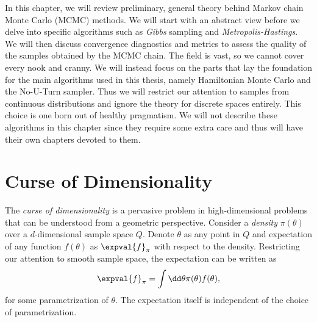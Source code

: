 In this chapter, we will review preliminary, general theory behind Markov chain Monte Carlo (MCMC) methods. We will start with an abstract view before we delve into
specific algorithms such as \textit{Gibbs} sampling and \textit{Metropolis-Hastings}. We will then discuss convergence diagnostics and metrics to assess the
quality of the samples obtained by the MCMC chain. The field is vast, so we cannot cover every nook and cranny. We will instead
focus on the parts that lay the foundation for the main algorithms used in this thesis, namely Hamiltonian Monte Carlo and the No-U-Turn sampler. 
Thus we will restrict our attention to samples from continuous distributions and ignore the theory for discrete spaces entirely.
This choice is one born out of healthy pragmatism.
We will not describe these algorithms in this chapter since they require some extra care and thus will have their own chapters devoted to them.

\begin{comment}
  \section{Curse of Dimensionality}
The \textit{curse of dimensionality} can be understood from a geometric perspective. 
Consider a \textit{density} $\pi(\theta)$ over a space $d$-dimensional space $Q$. Denote $\theta$ as any point in $Q$ and expectation of any function
$f(\theta)$ as $\expval{f}_\pi$ with respect to the density. Restricting our attention to smooth sample space, the expectation can be written as
\begin{equation}
  \expval{f}_\theta = \int \dd \theta \pi(\theta) f(\theta). 
\end{equation}  
\end{comment}

\section{Curse of Dimensionality}
The \textit{curse of dimensionality} is a pervasive problem in high-dimensional problems that can be understood from a geometric perspective. 
Consider a \textit{density} $\pi(\theta)$ over a $d$-dimensional sample space $Q$. Denote $\theta$ as any point in $Q$ and expectation of any function
$f(\theta)$ as $\expval{f}_\pi$ with respect to the density. Restricting our attention to smooth sample space, the expectation can be written as
\begin{equation}
  \expval{f}_\pi = \int \dd \theta \pi(\theta) f(\theta),
\end{equation}  
for some parametrization of $\theta$. The expectation itself is independent of the choice of parametrization. 



